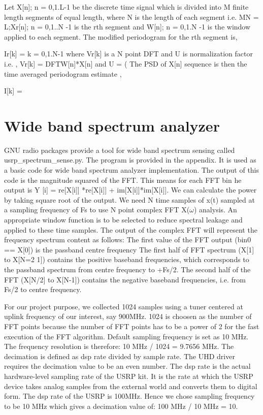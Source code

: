 Let X[n]; n = 0,1.L-1 be the discrete time signal which is  divided into M 
finite length segments of equal length, where N is the length of each segment  
i.e. MN = L;Xr[n]; n = 0,1..N -1 is the rth segment and W[n]; n = 0,1.N -1 is 
the window applied to each segment. The modified periodogram for the rth segment
 is,

Ir[k] =      k = 0,1.N-1
where Vr[k] is a N point DFT and U is normalization factor i.e. , 
Vr[k] = DFT{W[n]*X[n]}
and U = (
The PSD of X[n] sequence is then the time averaged periodogram estimate ,

I[k] =

\section{Wide band spectrum analyzer}

GNU radio packages provide a tool for wide band spectrum sensing called 
usrp\_spectrum\_sense.py. The program is provided in the appendix. 
It is used as
a basic code for wide band spectrum analyzer implementation. The output of this 
code is the magnitude squared of the FFT. This means for each FFT bin he output 
is Y [i] = re[X[i]] *re[X[i]] + im[X[i]]*im[X[i]]. We can calculate the power by
taking square root of the output. We need N time samples of x(t) sampled at a 
sampling frequency of Fs to use N point complex FFT X($\omega$) analysis. An 
appropriate window function is to be selected to reduce spectral leakage and 
applied to these time samples. The output of the complex FFT will represent the 
frequency spectrum content as follows: The first value of the FFT output 
(bin0 == X[0]) is the passband centre frequency The first half of FFT spectrum 
(X[1] to X[N=2 1]) contains the positive baseband frequencies, which corresponds
to the passband spectrum from centre frequency to +Fs/2. The second half of the 
FFT (X[N/2] to X[N-1]) contains the negative baseband frequencies, i.e. from 
Fs/2 to centre frequency.


For our project purpose, we collected 1024 samples using a tuner centered at 
uplink frequency of our interest, say 900MHz. 1024 is choosen as the number of 
FFT points because the number of FFT points has to be a power of 2 for the fast 
execution of the FFT algorithm. Default  sampling frequency is set as 10 MHz. 
The frequency resolution is therefore: 10 MHz / 1024 = 9.7656 MHz. The 
decimation is defined as dsp rate divided by sample rate. The UHD driver 
requires the decimation value to be an even number. The dsp rate is the actual 
hardware-level sampling rate of the USRP kit. It is the rate at which the USRP 
device takes analog samples from the external world and converts them to digital
form. The dsp rate of the USRP is 100MHz. Hence we chose sampling frequency to 
be 10 MHz which gives a decimation value of: 100 MHz / 10 MHz = 10.
